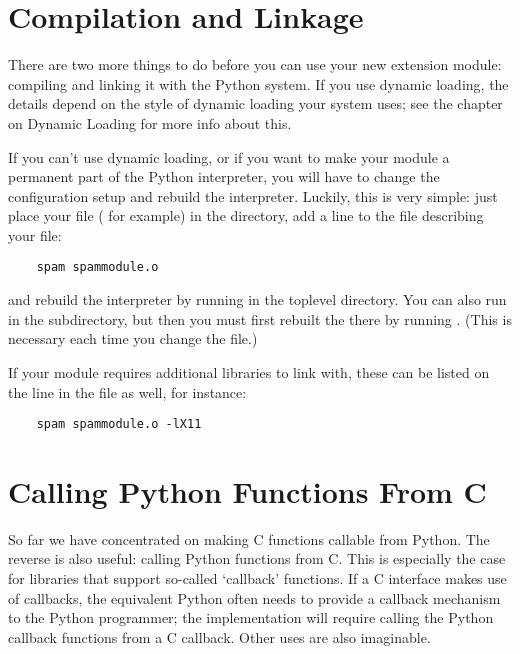 \section{Compilation and Linkage}

There are two more things to do before you can use your new extension
module: compiling and linking it with the Python system.  If you use
dynamic loading, the details depend on the style of dynamic loading
your system uses; see the chapter on Dynamic Loading for more info
about this.

If you can't use dynamic loading, or if you want to make your module a
permanent part of the Python interpreter, you will have to change the
configuration setup and rebuild the interpreter.  Luckily, this is
very simple: just place your file ( for example) in
the  directory, add a line to the file
 describing your file:

\begin{verbatim}
    spam spammodule.o
\end{verbatim}

and rebuild the interpreter by running  in the toplevel
directory.  You can also run  in the 
subdirectory, but then you must first rebuilt the 
there by running .  (This is necessary each time
you change the  file.)

If your module requires additional libraries to link with, these can
be listed on the line in the  file as well, for instance:

\begin{verbatim}
    spam spammodule.o -lX11
\end{verbatim}


\section{Calling Python Functions From C}

So far we have concentrated on making C functions callable from
Python.  The reverse is also useful: calling Python functions from C.
This is especially the case for libraries that support so-called
`callback' functions.  If a C interface makes use of callbacks, the
equivalent Python often needs to provide a callback mechanism to the
Python programmer; the implementation will require calling the Python
callback functions from a C callback.  Other uses are also imaginable.

